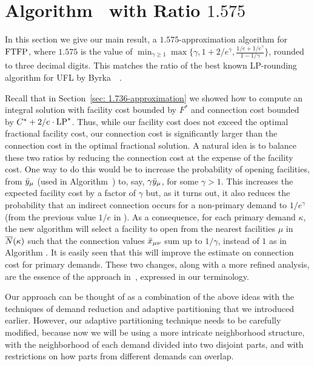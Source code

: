 \documentclass[oneside,final]{ucr}
\begin{document}
\section{Algorithm~{\EBGS} with Ratio $1.575$}
\label{sec: 1.575-approximation}

In this section we give our main result, a $1.575$-approximation
algorithm for $\mbox{\rm FTFP}$, where $1.575$ is the value of $\min_{\gamma\geq
  1}\max\{\gamma, 1+2/e^\gamma, \frac{1/e+1/e^\gamma}{1-1/\gamma}\}$,
rounded to three decimal digits. This matches the ratio of the best
known LP-rounding algorithm for UFL by
Byrka~{\etal}~\cite{ByrkaGS10}. 

Recall that in Section~\ref{sec: 1.736-approximation} we showed how to
compute an integral solution with facility cost bounded by $F^\ast$
and connection cost bounded by $C^\ast + 2/e\cdot\mbox{\rm LP}^\ast$. Thus,
while our facility cost does not exceed the optimal fractional
facility cost, our connection cost is significantly larger than the
connection cost in the optimal fractional solution.  A natural idea is
to balance these two ratios by reducing the connection cost at the
expense of the facility cost. One way to do this would be to increase
the probability of opening facilities, from ${\bar y}_{\mu}$ (used in
Algorithm~{\ECHS}) to, say, $\gamma{\bar y}_{\mu}$, for some $\gamma >
1$. This increases the expected facility cost by a factor of $\gamma$
but, as it turns out, it also reduces the probability that an indirect
connection occurs for a non-primary demand to $1/e^\gamma$ (from the
previous value $1/e$ in {\ECHS}). As a consequence, for each primary
demand $\kappa$, the new algorithm will select a facility to open from
the nearest facilities $\mu$ in ${\overline{N}}(\kappa)$ such that the
connection values ${\bar x}_{\mu\nu}$ sum up to $1/\gamma$, instead of
$1$ as in Algorithm {\ECHS}. It is easily seen that this will improve
the estimate on connection cost for primary demands.  These two
changes, along with a more refined analysis, are the essence of the
approach in~\cite{ByrkaGS10}, expressed in our terminology.

Our approach can be thought of as a combination of the above ideas
with the techniques of demand reduction and
adaptive partitioning that we introduced earlier. However, our
adaptive partitioning technique needs to be carefully modified,
because now we will be using a more intricate neighborhood structure,
with the neighborhood of each demand divided into two disjoint parts,
and with restrictions on how parts from different demands can overlap.
\end{document}
